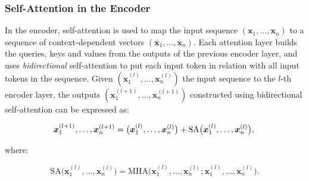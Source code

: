 


\subsubsection{Self-Attention in the Encoder} 

In the encoder, self-attention is used to map the input sequence $(\bm{x}_1, \ldots, \bm{x}_n)$ to a sequence of context-dependent vectors $(\overline{\bm{x}}_1, \ldots, \overline{\bm{x}}_n)$. Each attention layer builds the queries, keys and values from the outputs of the previous encoder layer, and uses \textit{bidirectional} self-attention to put each input token in relation with all input tokens in the sequence. Given $(\bm{x}^{(l)}_1, \ldots, \bm{x}^{(l)}_n)$ the input sequence to the $l$-th encoder layer, the outputs $(\bm{x}^{(l+1)}_1, \ldots, \bm{x}^{(l+1)}_n)$ constructed using bidirectional self-attention can be expressed as:

\begin{equation}
    \bm{x}^{(l+1)}_1, \ldots, \bm{x}^{(l+1)}_n = \bigl(\bm{x}^{(l)}_1, \ldots, \bm{x}^{(l)}_n\bigr) + \textrm{SA}\bigl(\bm{x}^{(l)}_1, \ldots, \bm{x}^{(l)}_n\bigr), \\
\end{equation}

\noindent where:

\begin{equation}
    \textrm{SA}\bigl(\bm{x}^{(l)}_1, \ldots, \bm{x}^{(l)}_n\bigr) = \textrm{MHA}\bigl(\bm{x}^{(l)}_1, \ldots, \bm{x}^{(l)}_n ; \bm{x}^{(l)}_1, \ldots, \bm{x}^{(l)}_n\bigr).
\end{equation}

